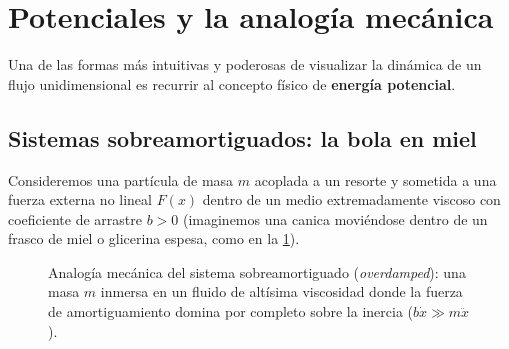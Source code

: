 \section{Potenciales y la analogía mecánica}

Una de las formas más intuitivas y poderosas de visualizar la dinámica de un flujo unidimensional es recurrir al concepto físico de \textbf{energía potencial}.

\subsection{Sistemas sobreamortiguados: la bola en miel}

Consideremos una partícula de masa $m$ acoplada a un resorte y sometida a una fuerza externa no lineal $F(x)$ dentro de un medio extremadamente viscoso con coeficiente de arrastre $b > 0$ (imaginemos una canica moviéndose dentro de un frasco de miel o glicerina espesa, como en la \cref{fig:masa_en_miel}).

\begin{figure}[htbp]
\centering
{}
\caption{Analogía mecánica del sistema sobreamortiguado (\emph{overdamped}): una masa $m$ inmersa en un fluido de altísima viscosidad donde la fuerza de amortiguamiento domina por completo sobre la inercia ($b\dot{x} \gg m\ddot{x}$).}
\label{fig:masa_en_miel}
\end{figure}


